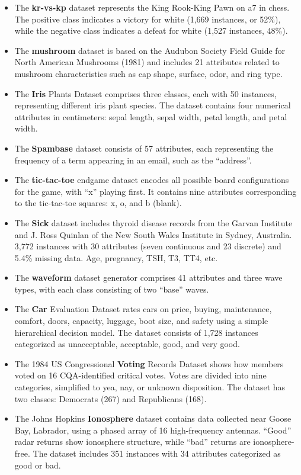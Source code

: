 \begin{itemize}
    \item The \textbf{kr-vs-kp} dataset represents the King Rook-King Pawn on a7 in chess. The positive class indicates a victory for white (1,669 instances, or 52\%), while the negative class indicates a defeat for white (1,527 instances, 48\%).

    \item The \textbf{mushroom} dataset is based on the Audubon Society Field Guide for North American Mushrooms (1981) and includes 21 attributes related to mushroom characteristics such as cap shape, surface, odor, and ring type.

    \item The \textbf{Iris} Plants Dataset comprises three classes, each with 50 instances, representing different iris plant species. The dataset contains four numerical attributes in centimeters: sepal length, sepal width, petal length, and petal width.

    \item The \textbf{Spambase} dataset consists of 57 attributes, each representing the frequency of a term appearing in an email, such as the ``address''.

    \item The \textbf{tic-tac-toe} endgame dataset encodes all possible board configurations for the game, with ``x'' playing first. It contains nine attributes corresponding to the tic-tac-toe squares: x, o, and b (blank).

    \item The \textbf{Sick} dataset includes thyroid disease records from the Garvan Institute and J. Ross Quinlan of the New South Wales Institute in Sydney, Australia. 3,772 instances with 30 attributes (seven continuous and 23 discrete) and 5.4\% missing data. Age, pregnancy, TSH, T3, TT4, etc.

    \item The \textbf{waveform} dataset generator comprises 41 attributes and three wave types, with each class consisting of two ``base'' waves.

    \item The \textbf{Car} Evaluation Dataset rates cars on price, buying, maintenance, comfort, doors, capacity, luggage, boot size, and safety using a simple hierarchical decision model. The dataset consists of 1,728 instances categorized as unacceptable, acceptable, good, and very good.

    \item The 1984 US Congressional \textbf{Voting} Records Dataset shows how members voted on 16 CQA-identified critical votes. Votes are divided into nine categories, simplified to yea, nay, or unknown disposition. The dataset has two classes: Democrats (267) and Republicans (168).

    \item The Johns Hopkins \textbf{Ionosphere} dataset contains data collected near Goose Bay, Labrador, using a phased array of 16 high-frequency antennas. ``Good'' radar returns show ionosphere structure, while ``bad'' returns are ionosphere-free. The dataset includes 351 instances with 34 attributes categorized as good or bad.
\end{itemize}

